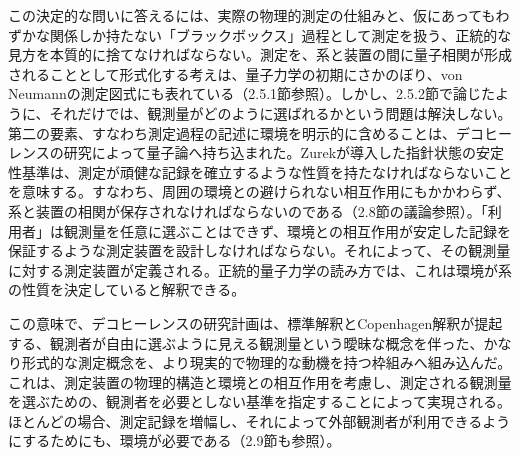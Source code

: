 この決定的な問いに答えるには、実際の物理的測定の仕組みと、仮にあってもわずかな関係しか持たない「ブラックボックス」過程として測定を扱う、正統的な見方を本質的に捨てなければならない。測定を、系と装置の間に量子相関が形成されることとして形式化する考えは、量子力学の初期にさかのぼり、von Neumannの測定図式にも表れている（2.5.1節参照）。しかし、2.5.2節で論じたように、それだけでは、観測量がどのように選ばれるかという問題は解決しない。第二の要素、すなわち測定過程の記述に環境を明示的に含めることは、デコヒーレンスの研究によって量子論へ持ち込まれた。Zurek\cite{ref008}が導入した指針状態の安定性基準は、測定が頑健な記録を確立するような性質を持たなければならないことを意味する。すなわち、周囲の環境との避けられない相互作用にもかかわらず、系と装置の相関が保存されなければならないのである（2.8節の議論参照）。「利用者」は観測量を任意に選ぶことはできず、環境との相互作用が安定した記録を保証するような測定装置を設計しなければならない。それによって、その観測量に対する測定装置が定義される。正統的量子力学の読み方では、これは環境が系の性質を決定していると解釈できる。

この意味で、デコヒーレンスの研究計画は、標準解釈とCopenhagen解釈が提起する、観測者が自由に選ぶように見える観測量という曖昧な概念を伴った、かなり形式的な測定概念を、より現実的で物理的な動機を持つ枠組みへ組み込んだ\cite{ref388}。
\hypertarget{srcpage:335}{}\label{srcpage:335}
これは、測定装置の物理的構造と環境との相互作用を考慮し、測定される観測量を選ぶための、観測者を必要としない基準を指定することによって実現される。ほとんどの場合、測定記録を増幅し\cite{ref076}、それによって外部観測者が利用できるようにするためにも、環境が必要である（2.9節も参照）。

